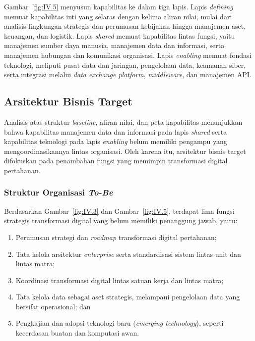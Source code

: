 Gambar~\ref{fig:IV.5} menyusun kapabilitas ke dalam tiga lapis. Lapis \textit{defining} memuat kapabilitas inti yang selaras dengan kelima aliran nilai, mulai dari analisis lingkungan strategis dan perumusan kebijakan hingga manajemen aset, keuangan, dan logistik. Lapis \textit{shared} memuat kapabilitas lintas fungsi, yaitu manajemen sumber daya manusia, manajemen data dan informasi, serta manajemen hubungan dan komunikasi organisasi. Lapis \textit{enabling} memuat fondasi teknologi, meliputi pusat data dan jaringan, pengelolaan data, keamanan siber, serta integrasi melalui \textit{data exchange platform}, \textit{middleware}, dan manajemen API.

\subsection{Arsitektur Bisnis Target}
\label{sec:IV.3.4}

Analisis atas struktur \textit{baseline}, aliran nilai, dan peta kapabilitas menunjukkan bahwa kapabilitas manajemen data dan informasi pada lapis \textit{shared} serta kapabilitas teknologi pada lapis \textit{enabling} belum memiliki pengampu yang mengoordinasikannya lintas organisasi. Oleh karena itu, arsitektur bisnis target difokuskan pada penambahan fungsi yang memimpin transformasi digital pertahanan.

\subsubsection{Struktur Organisasi \textit{To-Be}}
\label{sec:IV.3.4.1}

Berdasarkan Gambar~\ref{fig:IV.3} dan Gambar~\ref{fig:IV.5}, terdapat lima fungsi strategis transformasi digital yang belum memiliki penanggung jawab, yaitu:
\begin{enumerate}[label=\arabic*.]
\item Perumusan strategi dan \textit{roadmap} transformasi digital pertahanan;
\item Tata kelola arsitektur \textit{enterprise} serta standardisasi sistem lintas unit dan lintas matra;
\item Koordinasi transformasi digital lintas satuan kerja dan lintas matra;
\item Tata kelola data sebagai aset strategis, melampaui pengelolaan data yang bersifat operasional; dan
\item Pengkajian dan adopsi teknologi baru (\textit{emerging technology}), seperti kecerdasan buatan dan komputasi awan.
\end{enumerate}

